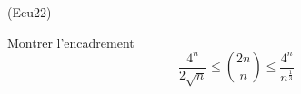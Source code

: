 \begin{tiny}(Ecu22)\end{tiny} Montrer l'encadrement
\begin{displaymath}
  \frac{4^n}{2\sqrt{n}}\leq \binom{2n}{n} \leq \frac{4^n}{n^{\frac{1}{3}}}
\end{displaymath}
